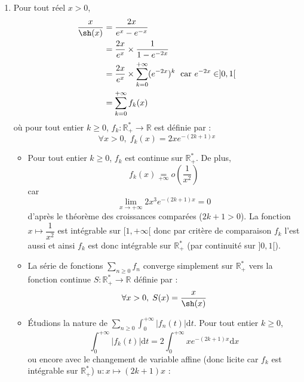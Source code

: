 \documentclass[a4paper,twoside,french,10pt]{VcCours}
\newcommand{\dx}{\text{d}x}
\newcommand{\dt}{\text{d}t}
\begin{document}
\begin{enumerate}
\noindent On a :
$$ \dfrac{x}{\sh(x)}  \underset{+ \infty}{=} o \left( \dfrac{1}{x^2} \right)$$
car 
\begin{align*}
\dfrac{x^3}{\sh(x)} & = \dfrac{2x^3}{e^{x}-e^{-x}} \\
&  \underset{+ \infty}{\sim} \dfrac{2x^3}{e^{x}} 
\end{align*}
et d'après le théorème des croissances comparées :
$$ \lim_{x \rightarrow + \infty} \dfrac{2x^3}{e^{x}} = 0$$
L'intégrale $\int_1^{+ \infty} \dfrac{1}{x^2} \dx$ est convergente (intégrale de Riemann avec $2>1$) donc par critère de comparaison (les intégrandes sont positives), on en déduit que $\int_1^{+ \infty} \dfrac{x}{\sh(x)} \dx$ est convergente et ainsi $I$ converge (par fausse impropreté en $0$).
\item Pour tout réel $x>0$,
\begin{align*}
\dfrac{x}{\sh(x)} & = \dfrac{2x}{e^x-e^{-x}} \\
& = \dfrac{2x}{e^x} \times \dfrac{1}{1-e^{-2x}} \\
& =  \dfrac{2x}{e^x} \times \sum_{k=0}^{+ \infty} (e^{-2x})^k \; \hbox{ car } e^{-2x} \in ]0,1[ \\
& = \sum_{k=0}^{+ \infty} f_k(x)
\end{align*}
où pour tout entier $k \geq 0$, $f_k : \mathbb{R}_+^* \rightarrow \mathbb{R}$ est définie par :
$$ \forall x>0, \; f_k(x) = 2x e^{-(2k+1)x} $$
\begin{itemize}
\item Pour tout entier $k \geq 0$, $f_k$ est continue sur $\mathbb{R}_+^*$. De plus,
$$ f_k(x) \underset{ + \infty}{=} o \left( \dfrac{1}{x^2} \right)$$
car 
$$ \lim_{x \rightarrow + \infty} 2x^3 e^{-(2k+1)x} = 0$$
d'après le théorème des croissances comparées ($2k+1>0$). La fonction $x \mapsto \dfrac{1}{x^2}$ est intégrable sur $[1, + \infty[$ donc par critère de comparaison $f_k$ l'est aussi et ainsi $f_k$ est donc intégrable sur $\mathbb{R}_+^*$ (par continuité sur $]0,1[$). 
\item La série de fonctions $\sum_{n \geq 0} f_n$ converge simplement sur $\mathbb{R}_+^*$ vers la fonction continue $S : \mathbb{R}_+^* \rightarrow \mathbb{R}$ définie par :
$$ \forall x >0, \; S(x) = \dfrac{x}{\sh(x)}$$
\item Étudions la nature de $\sum_{n \geq 0} \int_{0}^{+ \infty} \vert f_n(t) \vert \dt$. Pour tout entier $k \geq 0$,
$$ \int_0^{+ \infty} \vert f_k(t) \vert \dt = 2 \int_0^{+\infty} x e^{-(2k+1)x} \dx$$
ou encore avec le changement de variable affine (donc licite car $f_k$ est intégrable sur $\mathbb{R}_+^*$) $u : x \mapsto (2k+1)x$ :

\end{itemize}
\end{enumerate}
\end{document}
